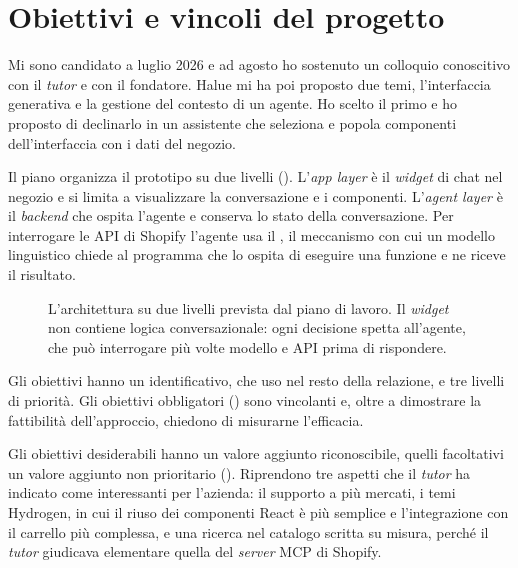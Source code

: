 
\section{Obiettivi e vincoli del progetto}
\label{sec:obiettivi}

Mi sono candidato a luglio 2026 e ad agosto ho sostenuto un colloquio conoscitivo con il
\emph{tutor} e con il fondatore. Halue mi ha poi proposto due temi, l’interfaccia generativa e la
gestione del contesto di un agente. Ho scelto il primo e ho proposto di declinarlo in un assistente
che seleziona e popola componenti dell’interfaccia con i dati del negozio.

Il piano organizza il prototipo su due livelli (). L’\emph{app layer} è il
\emph{widget} di chat nel negozio e si limita a visualizzare la conversazione e i componenti.
L’\emph{agent layer} è il \emph{backend} che ospita l’agente e conserva lo stato della
conversazione. Per interrogare le API di Shopify l’agente usa il
, il meccanismo con cui un modello linguistico chiede al
programma che lo ospita di eseguire una funzione e ne riceve il risultato.

\begin{figure}[htbp]
	\centering
	
	\caption[L’architettura su due livelli prevista dal piano di lavoro]{L’architettura su due
	livelli prevista dal piano di lavoro. Il \emph{widget} non contiene logica conversazionale: ogni
	decisione spetta all’agente, che può interrogare più volte modello e API prima di rispondere.}
	\label{fig:livelli}
\end{figure}

Gli obiettivi hanno un identificativo, che uso nel resto della relazione, e tre livelli di
priorità. Gli obiettivi obbligatori () sono vincolanti e, oltre a
dimostrare la fattibilità dell’approccio, chiedono di misurarne l’efficacia.

Gli obiettivi desiderabili hanno un valore aggiunto riconoscibile, quelli facoltativi un valore
aggiunto non prioritario (). Riprendono tre aspetti che il \emph{tutor}
ha indicato come interessanti per l’azienda: il supporto a più mercati, i temi Hydrogen, in cui il
riuso dei componenti React è più semplice e l’integrazione con il carrello più complessa, e una
ricerca nel catalogo scritta su misura, perché il \emph{tutor} giudicava elementare quella del
\emph{server} MCP di Shopify.

